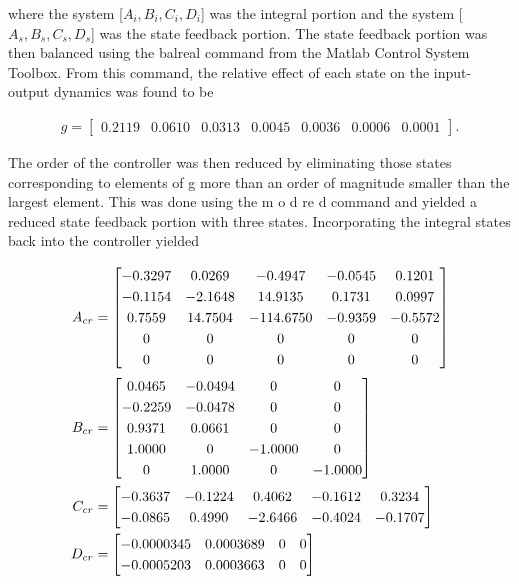 \noindent where the system [$A_{i},B_{i},C_{i},D_{i}$] was the integral portion and the system [$A_{s},B_{s},C_{s},D_{s}$] was the state feedback portion. The state feedback portion was then balanced using the balreal command from the Matlab Control System Toolbox. From this command, the relative effect of each state on the input-output dynamics was found to be


\begin{align}
	g = \begin{bmatrix}
		0.2119 & 0.0610 & 0.0313 & 0.0045 & 0.0036 & 0.0006 & 0.0001
	\end{bmatrix}.
\end{align}

\noindent The order of the controller was then reduced by eliminating those states corresponding to elements of g more than an order of magnitude smaller than the largest element. This was done using the m o d re d command and yielded a reduced state feedback portion with three states. Incorporating the integral states back into the controller yielded

\begin{align}
	A_{cr} &= \renewcommand\arraystretch{1.25}\begin{bmatrix}
		-0.3297 & 0.0269 & -0.4947 & -0.0545 & 0.1201 \\ -0.1154 & -2.1648 & 14.9135 & 0.1731 & 0.0997 \\ 0.7559 & 14.7504 & -114.6750 & -0.9359 & -0.5572 \\ 0 & 0 & 0 & 0 & 0 \\ 0 & 0 & 0 & 0 & 0
	\end{bmatrix} \\
	B_{cr} &= \renewcommand\arraystretch{1.25}\begin{bmatrix}
		0.0465 & -0.0494 & 0 & 0 \\ -0.2259 & -0.0478 & 0 & 0 \\ 0.9371 & 0.0661 & 0 & 0 \\ 1.0000 & 0 & -1.0000 & 0 \\ 0 & 1.0000 & 0 & -1.0000
	\end{bmatrix} \\
	C_{cr} &= \renewcommand\arraystretch{1.25}\begin{bmatrix}
		-0.3637 & -0.1224 & 0.4062 & -0.1612 & 0.3234 \\ -0.0865 & 0.4990 & -2.6466 & -0.4024 & -0.1707
	\end{bmatrix} \\
	D_{cr} &= \renewcommand\arraystretch{1.25}\begin{bmatrix}
		-0.0000345 & 0.0003689 & 0 & 0 \\ -0.0005203 & 0.0003663 & 0 & 0
	\end{bmatrix}
\end{align}

